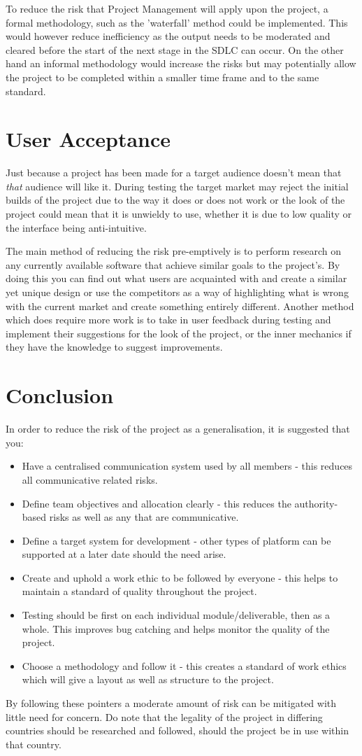 To reduce the risk that Project Management will apply upon the project, a formal
methodology, such as the 'waterfall' method could be implemented.  This would
however reduce inefficiency as the output needs to be moderated and cleared
before the start of the next stage in the SDLC can occur.  On the other hand an
informal methodology would increase the risks but may potentially allow the
project to be completed within a smaller time frame and to the same standard.

\section{User Acceptance}
Just because a project has been made for a target audience doesn't mean that
\textit{that} audience will like it.  During testing the target market may
reject the initial builds of the project due to the way it does or does not work
or the look of the project could mean that it is unwieldy to use, whether it is
due to low quality or the interface being anti-intuitive.

The main method of reducing the risk pre-emptively is to perform research on any
currently available software that achieve similar goals to the project's.  By
doing this you can find out what users are acquainted with and create a similar
yet unique design or use the competitors as a way of highlighting what is wrong
with the current market and create something entirely different.  Another method
which does require more work is to take in user feedback during testing and
implement their suggestions for the look of the project, or the inner mechanics
if they have the knowledge to suggest improvements.

\section{Conclusion}
In order to reduce the risk of the project as a generalisation, it is suggested
that you:

\begin{itemize}
    \item Have a centralised communication system used by all members - this
          reduces all communicative related risks.
    \item Define team objectives and allocation clearly - this reduces the
          authority-based risks as well as any that are communicative.
    \item Define a target system for development - other types of platform can
          be supported at a later date should the need arise.
    \item Create and uphold a work ethic to be followed by everyone - this helps
          to maintain a standard of quality throughout the project.
    \item Testing should be first on each individual module/deliverable, then as
          a whole.  This improves bug catching and helps monitor the quality of
          the project.
    \item Choose a methodology and follow it - this creates a standard of work
          ethics which will give a layout as well as structure to the project.
\end{itemize}

By following these pointers a moderate amount of risk can be mitigated with
little need for concern.  Do note that the legality of the project in differing
countries should be researched and followed, should the project be in use within
that country.